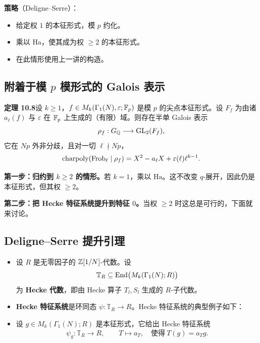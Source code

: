 \noindent\textbf{策略}（Deligne--Serre）：

\begin{itemize}
\item 给定权 $1$ 的本征形式，模 $p$ 约化。
\item 乘以 $\mathrm{Ha}$，使其成为权 $\ge 2$ 的本征形式。
\item 在此情形使用上一讲的构造。
\end{itemize}

\subsection*{附着于模 $p$ 模形式的 Galois 表示}
\noindent\textbf{定理 10.8}\label{thm:10.8}\quad 设 $k\ge 1$，$f\in M_k(\Gamma_1(N),\varepsilon;\mathbb{F}_p)$ 是模 $p$ 的尖点本征形式。设 $F_f$ 为由诸 $a_\ell(f)$ 与 $\varepsilon$ 在 $\mathbb{F}_p$ 上生成的（有限）域。则存在半单 Galois 表示
\[
\rho_f:G_{\mathbb{Q}}\longrightarrow\operatorname{GL}_2(F_f),
\]
它在 $Np$ 外非分歧，且对一切 $\ell\nmid Np$，
\[
\operatorname{charpoly}(\operatorname{Frob}_\ell\mid\rho_f)=X^2-a_\ell X+\varepsilon(\ell)\ell^{k-1}.
\]

\noindent\textbf{第一步：归约到 $k\ge 2$ 的情形。}若 $k=1$，乘以 $\mathrm{Ha}$。这不改变 $q$-展开，因此仍是本征形式，但其权 $\ge 2$。

\noindent\textbf{第二步：把 Hecke 特征系统提升到特征 $0$。}当权 $\ge 2$ 时这总是可行的，下面就来讨论。

\subsection*{Deligne--Serre 提升引理}

\begin{itemize}
\item 设 $R$ 是无零因子的 $\mathbb{Z}[1/N]$-代数。设
\[
\mathbb{T}_R\subseteq\operatorname{End}\bigl(M_k(\Gamma_1(N);R)\bigr)
\]
为 \textbf{Hecke 代数}，即由 Hecke 算子 $T_l,S_l$ 生成的 $R$-子代数。
\item \textbf{Hecke 特征系统}是环同态 $\psi:\mathbb{T}_R\to R$。Hecke 特征系统的典型例子如下：
\item 设 $g\in M_k(\Gamma_1(N);R)$ 是本征形式，它给出 Hecke 特征系统
\[
\psi_g:\mathbb{T}_R\longrightarrow R,\qquad T\longmapsto a_T,\quad\text{使得}\ T(g)=a_Tg.
\]
\end{itemize}

